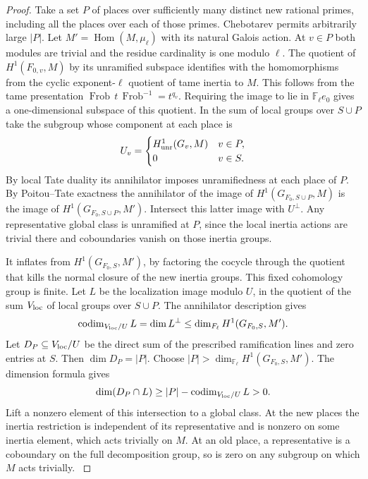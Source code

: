 \begin{proof}
Take a set \(P\) of places over sufficiently many distinct
new rational primes, including all the places over each of those
primes. Chebotarev permits arbitrarily large \(|P|\).
Let \(M'=\operatorname{Hom}(M,\mu_\ell)\) with its natural Galois
action. At \(v\in P\) both modules are trivial and the residue
cardinality is one modulo \(\ell\). The quotient of
\(H^1(F_{0,v},M)\) by its unramified subspace identifies with the
homomorphisms from the cyclic exponent-\(\ell\) quotient of tame
inertia to \(M\). This follows from the tame presentation
\(\operatorname{Frob}\,t\,\operatorname{Frob}^{-1}=t^{q_v}\).
Requiring the image to lie in \(\mathbb F_\ell e_0\) gives a
one-dimensional subspace of this quotient.
In the sum of local groups over \(S\cup P\) take the subgroup whose component at each place is
\[
 U_v=\begin{cases}H^1_{\rm unr}(G_v,M)&v\in P,\\0&v\in S.\end{cases}
\]
By local Tate duality its annihilator imposes unramifiedness at
each place of \(P\). By Poitou--Tate exactness the annihilator of
the image of \(H^1(G_{F_0,S\cup P},M)\) is the image of
\(H^1(G_{F_0,S\cup P},M')\). Intersect this latter image with
\(U^\perp\). Any representative global class is unramified at
\(P\), since the local inertia actions are trivial there and
coboundaries vanish on those inertia groups.

It inflates from
\(H^1(G_{F_0,S},M')\), by factoring the cocycle through the quotient
that kills the normal closure of the new inertia groups.
This fixed cohomology group is finite. Let \(L\) be the
localization image modulo \(U\), in the quotient of the sum
\(V_{\rm loc}\) of local groups over \(S\cup P\). The annihilator
description gives
\[
 \operatorname{codim}_{V_{\rm loc}/U}L
 =\dim L^\perp\le \dim_{\mathbb F_\ell}H^1(G_{F_0,S},M').
\]
Let \(D_P\subseteq V_{\rm loc}/U\) be the direct sum of the
prescribed ramification lines and zero entries at \(S\).
Then \(\dim D_P=|P|\). Choose
\(|P|>\dim_{\mathbb F_\ell}H^1(G_{F_0,S},M')\).
The dimension formula gives
\[
 \dim(D_P\cap L)\ge |P|-\operatorname{codim}_{V_{\rm loc}/U}L>0.
\]
Lift a nonzero element of this intersection to a global class.
At the new places the inertia restriction is independent of its
representative and is nonzero on some inertia element, which acts
trivially on \(M\). At an old place, a representative is a
coboundary on the full decomposition group, so is zero on any
subgroup on which \(M\) acts trivially.
\hfill\mbox{\cite{milne-duality}}\label{cor:cohomology-count-two-chain-1}
\end{proof}

